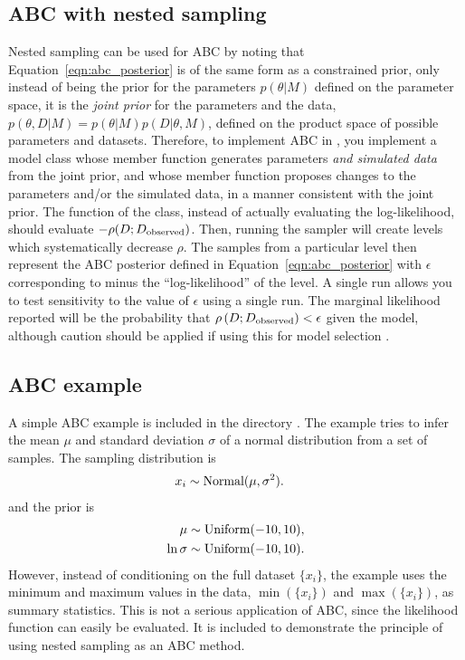 \documentclass[article]{jss}
\begin{document}
\subsection{ABC with nested sampling}
Nested sampling can be used for ABC by noting that Equation~\ref{eqn:abc_posterior}
is of the same form as a constrained prior, only instead of being the prior
for the parameters $p(\theta | M)$ defined on the parameter space, it is
the {\em joint prior} for the parameters and the data,
$p(\theta, D |M) = p(\theta | M)p(D | \theta, M)$, defined on the product
space of possible parameters and datasets. Therefore, to implement
ABC in , you implement a model class
whose  member function generates parameters {\em and simulated
data} from the joint prior, and whose  member function
proposes changes to the parameters and/or the simulated data, in a
manner consistent with the joint prior. The  function
of the class, instead of actually evaluating the log-likelihood, should
evaluate $-\rho(D; D_{\rm observed})$. Then, running the sampler
will create levels which systematically decrease $\rho$. The samples from
a particular level then represent the ABC posterior defined in
Equation~\ref{eqn:abc_posterior} with $\epsilon$ corresponding to minus
the ``log-likelihood'' of the level.
A single  run allows you to test sensitivity
to the value of $\epsilon$ using a single run.
The marginal likelihood reported will be
the probability that $\rho\left(D; D_{\rm observed}\right) < \epsilon$
given the model, although caution should be applied if
using this for model selection \citep{robert2011lack}.


\subsection{ABC example}
A simple ABC example is included in the directory
. The example tries to infer the mean
$\mu$ and standard deviation $\sigma$ of a normal distribution
from a set of samples. The sampling distribution is
\begin{align*}
x_i &\sim \textnormal{Normal}(\mu, \sigma^2).
\end{align*}
and the prior is
\begin{align*}
\mu &\sim \textnormal{Uniform}(-10, 10),\\
\ln\sigma &\sim \textnormal{Uniform}(-10, 10).
\end{align*}
However, instead of conditioning on the full dataset $\{x_i\}$, the example
uses the minimum and maximum values in the data,
$\min(\{x_i\})$ and $\max(\{x_i\})$, as summary statistics. This is
not a serious application of ABC, since the likelihood function can easily
be evaluated. It is included to demonstrate the principle of using
nested sampling as an ABC method.
\end{document}
